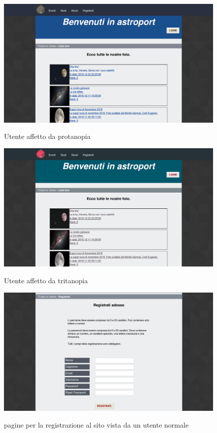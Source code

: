 	\begin{figure}
		\includegraphics[scale=0.3]{images/protanopia.jpg}\\[1cm] \caption{Utente affetto da protanopia}
	\end{figure}
	\begin{figure}
		\includegraphics[scale=0.3]{images/tritanopia.jpg}\\[1cm] \caption{Utente affetto da tritanopia}
	\end{figure}
	\begin{figure}
		\includegraphics[scale=0.3]{images/test2.png}\\[1cm] \caption{pagine per la registrazione al sito vista da un utente normale} \end{figure}
